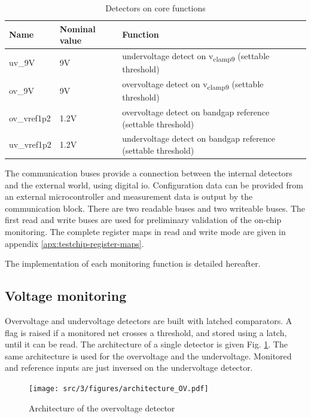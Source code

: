 \begin{table}[!htbp]
\centering
\begin{tabular}{@{}lll@{}}
\toprule
Name           & Nominal value & Function \\ \toprule
uv\_9V	       & 9V   & undervoltage detect on v\textsubscript{clamp9} (settable threshold)\\
ov\_9V	       & 9V   & overvoltage detect on v\textsubscript{clamp9} (settable threshold)\\
ov\_vref1p2	   & 1.2V & overvoltage detect on bandgap reference (settable threshold) \\
uv\_vref1p2	   & 1.2V & undervoltage detect on bandgap reference (settable threshold) \\
\bottomrule
\end{tabular}
\caption{Detectors on core functions}
\label{tab:detectors}
\end{table}

The communication buses provide a connection between the internal detectors and the external world, using digital \gls{io}.
Configuration data can be provided from an external microcontroller and measurement data is output by the communication block.
There are two readable buses and two writeable buses.
The first read and write buses are used for preliminary validation of the on-chip monitoring.
The complete register maps in read and write mode are given in appendix \ref{apx:testchip-register-maps}.

The implementation of each monitoring function is detailed hereafter.

\subsection{Voltage monitoring}

Overvoltage and undervoltage detectors are built with latched comparators.
A flag is raised if a monitored net crosses a threshold, and stored using a latch, until it can be read.
The architecture of a single detector is given Fig. \ref{fig:architecture-ov}.
The same architecture is used for the overvoltage and the undervoltage.
Monitored and reference inputs are just inversed on the undervoltage detector.

\begin{figure}[!h]
  \centering
  \texttt{[image: src/3/figures/architecture\_OV.pdf]}
  \caption{Architecture of the overvoltage detector}
  \label{fig:architecture-ov}
\end{figure}

